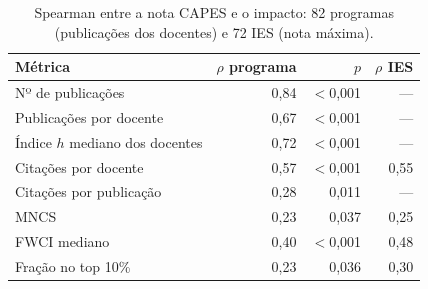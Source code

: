 \begin{table}[htbp]
\centering
\small
\caption{Spearman entre a nota CAPES e o impacto: 82 programas (publicações dos docentes) e 72 IES (nota máxima).}
\label{tab:capes}
\begin{tabular}{lrrr}
\hline
Métrica & $\rho$ programa & $p$ & $\rho$ IES \\
\hline
Nº de publicações & 0{,}84 & $<$0{,}001 & --- \\
Publicações por docente & 0{,}67 & $<$0{,}001 & --- \\
Índice $h$ mediano dos docentes & 0{,}72 & $<$0{,}001 & --- \\
Citações por docente & 0{,}57 & $<$0{,}001 & 0{,}55 \\
Citações por publicação & 0{,}28 & 0{,}011 & --- \\
MNCS & 0{,}23 & 0{,}037 & 0{,}25 \\
FWCI mediano & 0{,}40 & $<$0{,}001 & 0{,}48 \\
Fração no top 10\% & 0{,}23 & 0{,}036 & 0{,}30 \\
\hline
\end{tabular}
\end{table}
